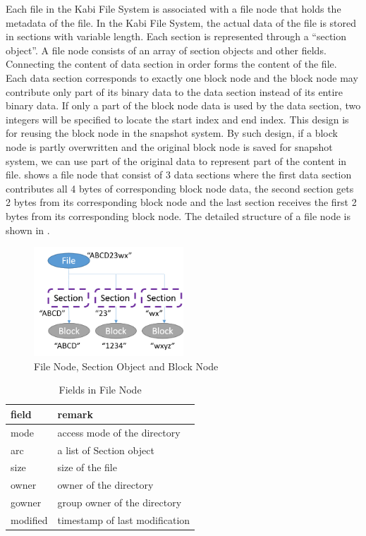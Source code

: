     Each file in the Kabi File System is associated with a file node that holds the metadata of the file. In the Kabi File System, the actual data of the file is stored in sections with variable length. Each section is represented through a ``section object''. A file node consists of an array of section objects and other fields. Connecting the content of data section in order forms the content of the file. Each data section corresponds to exactly one block node and the block node may contribute only part of its binary data to the data section instead of its entire binary data. If only a part of the block node data is used by the data section, two integers will be specified to locate the start index and end index. This design is for reusing the block node in the snapshot system. By such design, if a block node is partly overwritten and the original block node is saved for snapshot system, we can use part of the original data to represent part of the content in file.  shows a file node that consist of 3 data sections where the first data section contributes all 4 bytes of corresponding block node data, the second section gets 2 bytes from its corresponding block node and the last section receives the first 2 bytes from its corresponding block node. The detailed structure of a file node is shown in .

\begin{figure}[t]
\centering
\includegraphics[width=0.5\textwidth]{Chapter-3/figs/fig7.png}
\caption{File Node, Section Object and Block Node}
\label{fig:file_and_section}
\end{figure}


\begin{table}[t]
\label{tab:file_fields}
\begin{center}
\begin{tabular}{ll}
\toprule
field & remark\\
\midrule
mode & access mode of the directory\\
arc & a list of Section object\\
size & size of the file\\
owner & owner of the directory\\
gowner & group owner of the directory\\
modified & timestamp of last modification\\
\bottomrule
\end{tabular}
\end{center}
\caption{Fields in File Node}
\end{table}

